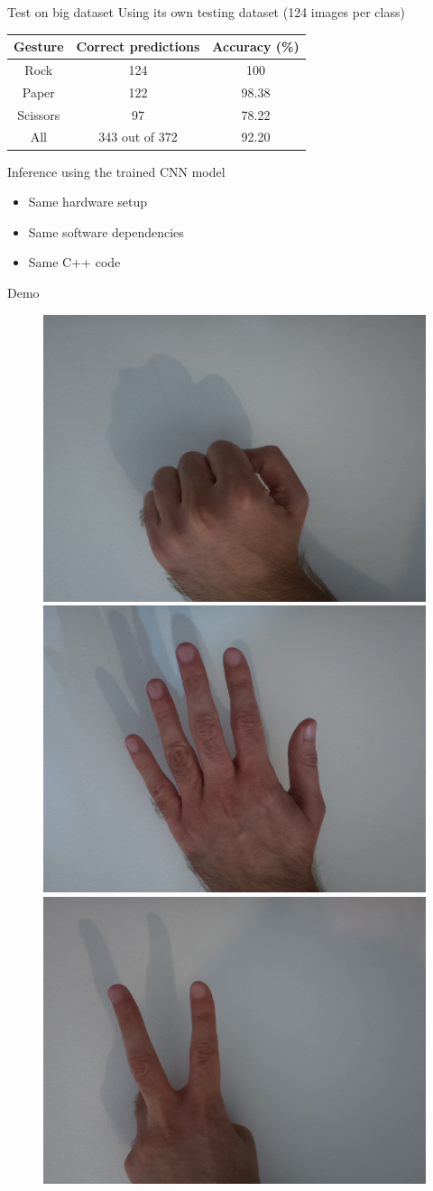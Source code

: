 \begin{frame}{Test on big dataset}
Using its own testing dataset (124 images per class)
  \begin{table}
	\begin{tabular}{|c|c|c|}
	  \hline
		\textbf{Gesture} & \textbf{Correct predictions} & \textbf{Accuracy (\%)} \\
	  \hline
		Rock & 124 & 100 \\
	  \hline
		Paper & 122 & 98.38 \\
	  \hline
		Scissors & 97 & 78.22 \\
	  \hline
	  \hline
		All & 343 out of 372 & 92.20 \\
	  \hline
	\end{tabular}
  \end{table}
\end{frame}

\begin{frame}{Inference using the trained CNN model}
  \begin{itemize}
	\item Same hardware setup
	\item Same software dependencies
	\item Same C++ code
  \end{itemize}
\end{frame}

\begin{frame}{Demo}
  \begin{figure}
	\includegraphics[width=0.33\linewidth,height=0.5\textheight,keepaspectratio]{../images/rock_input.jpeg}%
	\includegraphics[width=0.33\linewidth,height=0.5\textheight,keepaspectratio]{../images/paper_input.jpeg}%
	\includegraphics[width=0.33\linewidth,height=0.5\textheight,keepaspectratio]{../images/scissors_input.jpeg}
  \end{figure}
\end{frame}

